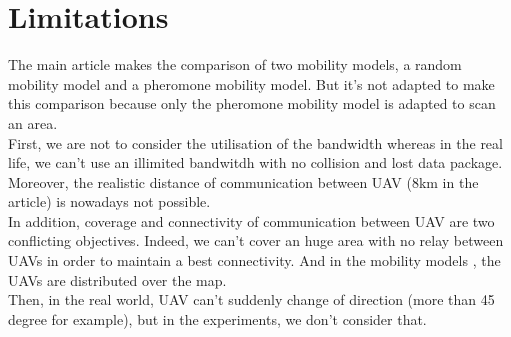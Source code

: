 \chapter{Limitations}

The main article \cite{UAV} makes the comparison of two mobility models, a random mobility model and a pheromone mobility model. But it's not adapted to make this comparison because only the pheromone mobility model is adapted to scan an area.\\

First, we are not to consider the utilisation of the bandwidth whereas in the real life, we can't use an illimited bandwitdh with no collision and lost data package.
Moreover, the realistic distance of communication between UAV (8km in the article) is nowadays not possible. \\

In addition, coverage and connectivity of communication between UAV are two conflicting objectives. Indeed, we can't cover an huge area with no relay between UAVs in order to maintain a best connectivity. And in the mobility models , the UAVs are distributed over the map.\\

Then, in the real world, UAV can't suddenly change of direction (more than 45 degree for example), but in the experiments, we don't consider that.